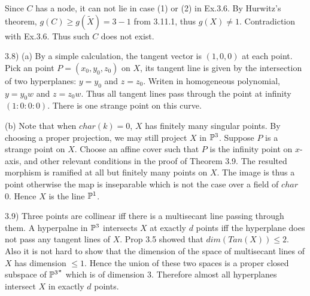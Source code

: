 Since $C$ has a node, it can not lie in case (1) or (2) in Ex.3.6. By
Hurwitz's theorem, $g(C)\geq g(\tilde{X})=3-1$ from 3.11.1, thus
$g(X)\not =1$. Contradiction with Ex.3.6. Thus such $C$ does not
exist.

3.8) (a) By a simple calculation, the tangent vector is $(1,0,0)$ at
each point. Pick an point $P=(x_0,y_0,z_0)$ on $X$, its tangent line
is given by the intersection of two hyperplanes: $y=y_0$ and $z=z_0$.
Writen in homogeneous polynomial, $y=y_0w$ and $z=z_0w$. Thus all
tangent lines pass through the point at infinity $(1:0:0:0)$. There is
one strange point on this curve.  

(b) Note that when $char(k)=0$, $X$ has finitely many singular points.
By choosing a proper projection, we may still project $X$ in ${\Bbb
P}^3$. Suppose $P$ is a strange point on $X$. Choose an affine cover
such that $P$ is the infinity point on $x$-axis, and other relevant
conditions in the proof of Theorem 3.9. The resulted morphism is
ramified at all but finitely many points on $X$. The image is thus a
point otherwise the map is inseparable which is not the case over a
field of $char$ 0. Hence $X$ is the line ${\Bbb P}^1$.

3.9) Three points are collinear iff there is a multisecant line passing
through them. A hyperpalne in ${\Bbb P}^3$ intersects $X$ at exactly
$d$ points iff the hyperplane does not pass any tangent lines of $X$. 
Prop 3.5 showed that $dim(Tan(X))\leq 2$. Also it is not hard to show
that the dimension of the space of multisecant lines of $X$ has
dimension $\leq 1$. Hence the union of these two spaces is a proper
closed subspace of ${{\Bbb P}^3}^*$ which is of dimension
$3$. Therefore almost all hyperplanes intersect $X$ in exactly $d$
points. 


